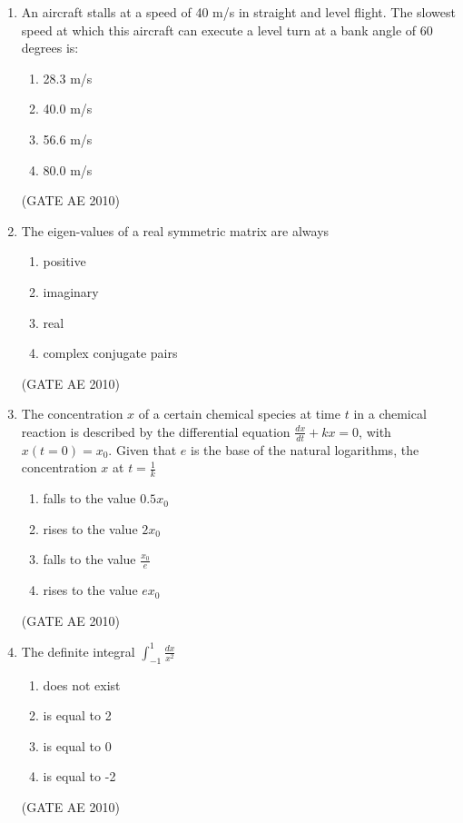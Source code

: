\documentclass[journal]{IEEEtran}
\begin{document}
\begin{enumerate}
\item An aircraft stalls at a speed of 40 m/s in straight and level flight. The slowest speed at which this aircraft can execute a level turn at a bank angle of 60 degrees is:
\begin{multicols}{4}
\begin{enumerate}
\item 28.3 m/s
\item 40.0 m/s
\item 56.6 m/s
\item 80.0 m/s
\end{enumerate}
\end{multicols}
\hfill (GATE AE 2010)

\item The eigen-values of a real symmetric matrix are always
\begin{multicols}{2}
\begin{enumerate}
\item positive
\item imaginary
\item real
\item complex conjugate pairs
\end{enumerate}
\end{multicols}
\hfill (GATE AE 2010)

\item The concentration $ x $ of a certain chemical species at time $ t $ in a chemical reaction is described by the differential equation $ \frac{dx}{dt} + kx = 0 $, with $ x(t = 0) = x_0 $. Given that $ e $ is the base of the natural logarithms, the concentration $ x $ at $ t = \frac{1}{k} $
\begin{multicols}{2}
\begin{enumerate}
\item falls to the value $ 0.5x_0 $
\item rises to the value $ 2x_0 $
\item falls to the value $ \frac{x_0}{e} $
\item rises to the value $ ex_0 $
\end{enumerate}
\end{multicols}
\hfill (GATE AE 2010)

\item The definite integral $ \int_{-1}^{1} \frac{dx}{x^2} $
\begin{multicols}{4}
\begin{enumerate}
\item does not exist
\item is equal to 2
\item is equal to 0
\item is equal to -2
\end{enumerate}
\end{multicols}
\hfill (GATE AE 2010)


\end{enumerate}
\end{document}
